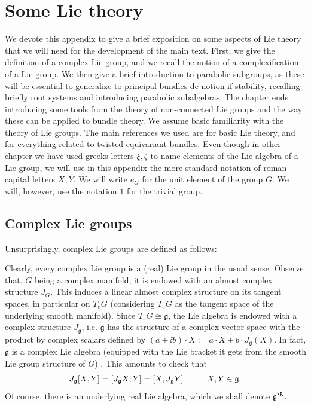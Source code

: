 \chapter{Some Lie theory} \label{appendix_lie}
We devote this appendix to give a brief exposition on some aspects of Lie theory that we will need for the development of the main text. First, we give the definition of a complex Lie group, and we recall the notion of a complexification of a Lie group. We then give a brief introduction to parabolic subgroups, as these will be essential to generalize to principal bundles de notion if stability, recalling briefly root systems and introducing parabolic subalgebras. The chapter ends introducing some tools from the theory of non-connected Lie groups and the way these can be applied to bundle theory.  We assume basic familiarity with the theory of Lie groups. The main references we used are \parencite{hilgert2011structure} for basic Lie theory, and \parencite{barajas2023non} for everything related to twisted equivariant bundles. Even though in other chapter we have used greeks letters \(\xi, \zeta\) to name elements of the Lie algebra of a Lie group, we will use in this appendix the more standard notation of roman capital letters \(X, Y\). We will write \(e_G\) for the unit element of the group \(G\). We will, however, use the notation \(1\) for the trivial group.

\section{Complex Lie groups} \label{section_complex_lie_group}
Unsurprisingly, complex Lie groups are defined as follows:

Clearly, every complex Lie group is a (real) Lie group in the usual sense. Observe that, \(G\) being a complex manifold, it is endowed with an almost complex structure \(J_G\). This induces a linear almost complex structure on its tangent spaces, in particular on \(T_eG\) (considering \(T_eG\) as the tangent space of the underlying smooth manifold). Since \(T_eG \cong \mathfrak{g}\), the Lie algebra is endowed with a complex structure \(J_\mathfrak{g}\), i.e. \(\mathfrak{g}\) has the structure of a complex vector space with the product by complex scalars defined by \((a+\ii b)\cdot X:=a\cdot X+ b \cdot J_\mathfrak{g}(X)\). In fact, \(\mathfrak{g}\) is a complex Lie algebra (equipped with the Lie bracket it gets from the smooth Lie group structure of \(G\)) \parencite[Page 55]{knapp2013lie}. This amounts to check that 
\begin{equation} \label{eq_comp_lie_algebra}
J_\mathfrak{g}[X,Y]=[J_{\mathfrak{g}}X, Y]=[X,J_\mathfrak{g}Y] \hspace{1 cm} X,Y \in \mathfrak{g}.
\end{equation}
Of course, there is an underlying real Lie algebra, which we shall denote \(\mathfrak{g}^\R\). \\

